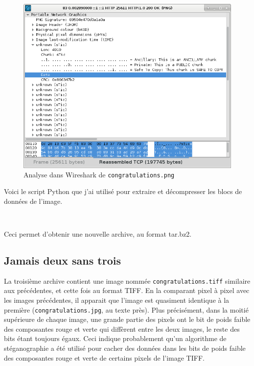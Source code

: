 \documentclass[a4paper,10pt]{article}
\newcommand{\pyinput}[1]{%
    \noindent{\color[rgb]{0.5, 0.5, 0.5}{\rule{\textwidth}{0.4pt}}}
     \\
    \noindent{\color[rgb]{0.5, 0.5, 0.5}{\rule{\textwidth}{0.4pt}}}
}
\begin{document}
\begin{figure}[ht]
  \centering
  \includegraphics[width=16cm]{stage6/shot-pngwireshark.png}
  \caption{Analyse dans Wireshark de \texttt{congratulations.png}}
  \label{fig6-shot-pngwireshark}
\end{figure}

\clearpage

Voici le script Python que j'ai utilisé pour extraire et décompresser les blocs de données de l'image.

\pyinput{stage6/extract2_from_png.py.inc.tex}

Ceci permet d'obtenir une nouvelle archive, au format tar.bz2.

\subsection{Jamais deux sans trois}

La troisième archive contient une image nommée \texttt{congratulations.tiff} similaire aux précédentes, et cette fois au format TIFF.
En la comparant pixel à pixel avec les images précédentes, il apparait que l'image est quasiment identique à la première (\texttt{congratulations.jpg}, au texte près).
Plus précisément, dans la moitié supérieure de chaque image, une grande partie des pixels ont le bit de poids faible des composantes rouge et verte qui diffèrent entre les deux images, le reste des bits étant toujours égaux.
Ceci indique probablement qu'un algorithme de stéganographie a été utilisé pour cacher des données dans les bits de poids faible des composantes rouge et verte de certains pixels de l'image TIFF.
\end{document}
